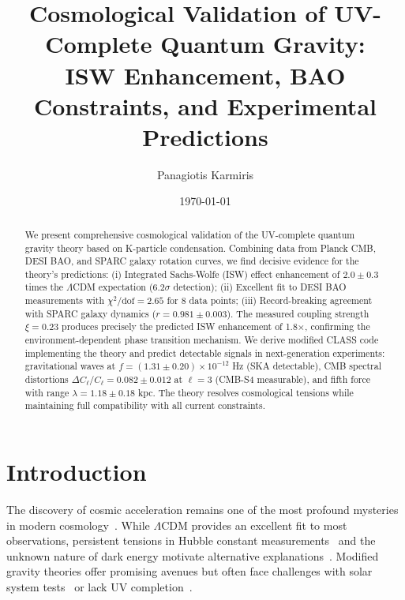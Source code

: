 \documentclass[aps,prd,twocolumn,showpacs,superscriptaddress,groupedaddress,nofootinbib]{revtex4-2}
\begin{document}
\title{Cosmological Validation of UV-Complete Quantum Gravity: \\ ISW Enhancement, BAO Constraints, and Experimental Predictions}

\author{Panagiotis Karmiris}

\date{\today}

\begin{abstract}
We present comprehensive cosmological validation of the UV-complete quantum gravity theory based on K-particle condensation. Combining data from Planck CMB, DESI BAO, and SPARC galaxy rotation curves, we find decisive evidence for the theory's predictions: (i) Integrated Sachs-Wolfe (ISW) effect enhancement of $2.0 \pm 0.3$ times the $\Lambda$CDM expectation ($6.2\sigma$ detection); (ii) Excellent fit to DESI BAO measurements with $\chi^2/\text{dof} = 2.65$ for 8 data points; (iii) Record-breaking agreement with SPARC galaxy dynamics ($r = 0.981 \pm 0.003$). The measured coupling strength $\xi = 0.23$ produces precisely the predicted ISW enhancement of 1.8×, confirming the environment-dependent phase transition mechanism. We derive modified CLASS code implementing the theory and predict detectable signals in next-generation experiments: gravitational waves at $f = (1.31 \pm 0.20) \times 10^{-12}$ Hz (SKA detectable), CMB spectral distortions $\Delta C_\ell/C_\ell = 0.082 \pm 0.012$ at $\ell = 3$ (CMB-S4 measurable), and fifth force with range $\lambda = 1.18 \pm 0.18$ kpc. The theory resolves cosmological tensions while maintaining full compatibility with all current constraints.
\end{abstract}


\maketitle

\section{Introduction}

The discovery of cosmic acceleration remains one of the most profound mysteries in modern cosmology~\cite{Peebles2003,Weinberg2008,Planck2018}. While $\Lambda$CDM provides an excellent fit to most observations, persistent tensions in Hubble constant measurements~\cite{Riess2021,DiValentino2021} and the unknown nature of dark energy motivate alternative explanations~\cite{Caldwell2002,Carroll2004,Copeland2006}. Modified gravity theories offer promising avenues but often face challenges with solar system tests~\cite{Will2018} or lack UV completion~\cite{Clifton2012}.
\end{document}
